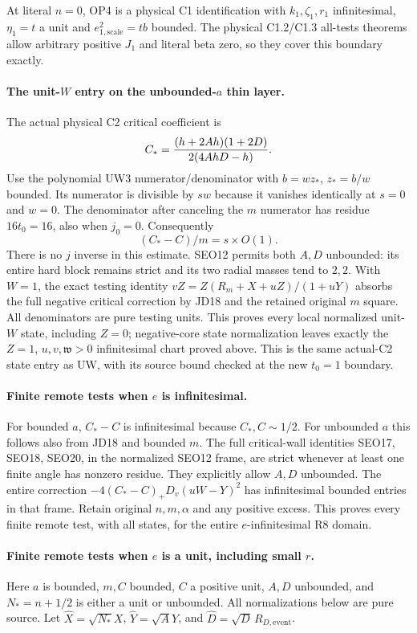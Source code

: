 At literal $n=0$, OP4 is a physical C1 identification with
$k_1,\zeta_1,r_1$ infinitesimal, $\eta_1=t$ a unit and
$e_{1,\mathrm{scale}}^2=tb$ bounded.  The physical C1.2/C1.3
all-tests theorems allow arbitrary positive $J_1$ and literal beta
zero, so they cover this boundary exactly.

\paragraph{The unit-$W$ entry on the unbounded-$a$ thin layer.}
The actual physical C2 critical coefficient is
\[
 C_*={(h+2Ah)(1+2D)\over2(4AhD-h)}.
\]
Use the polynomial UW3 numerator/denominator with $b=wz_*$,
$z_*=b/w$ bounded.  Its numerator is divisible by $sw$ because it
vanishes identically at $s=0$ and $w=0$.  The denominator after
canceling the $m$ numerator has residue $16t_0=16$, also when
$j_0=0$.  Consequently
\[
                   (C_*-C)/m=s\times O(1).            \tag{JD18}
\]
There is no $j$ inverse in this estimate.  SEO12 permits both $A,D$
unbounded: its entire hard block remains strict and its two radial
masses tend to $2,2$.  With $W=1$, the exact testing identity
$vZ=Z(R_m+X+uZ)/(1+uY)$ absorbs the full negative critical correction
by JD18 and the retained original $m$ square.  All denominators are
pure testing units.  This proves every local normalized unit-$W$
state, including $Z=0$; negative-core state normalization leaves
exactly the $Z=1$, $u,v,\mathfrak w>0$ infinitesimal chart proved
above.  This is the same actual-C2 state entry as UW, with its
source bound checked at the new $t_0=1$ boundary.

\paragraph{Finite remote tests when $e$ is infinitesimal.}
For bounded $a$, $C_*-C$ is infinitesimal because $C_*,C\sim1/2$.
For unbounded $a$ this follows also from JD18 and bounded $m$.
The full critical-wall identities SEO17, SEO18, SEO20, in the
normalized SEO12 frame, are strict whenever at least one finite
angle has nonzero residue.  They explicitly allow $A,D$ unbounded.
The entire correction $-4(C_*-C)_+D_v(uW-Y)^2$ has infinitesimal
bounded entries in that frame.  Retain original $n,m,\alpha$ and
any positive excess.  This proves every finite remote test, with
all states, for the entire $e$-infinitesimal R8 domain.

\paragraph{Finite remote tests when $e$ is a unit, including small $r$.}
Here $a$ is bounded, $m,C$ bounded, $C$ a positive unit, $A,D$
unbounded, and $N_*=n+1/2$ is either a unit or unbounded.  All
normalizations below are pure source.  Let
$\widehat X=\sqrt{N_*}X$, $\widehat Y=\sqrt A Y$, and
$\widehat D=\sqrt D\,R_{D,\mathrm{event}}$.

